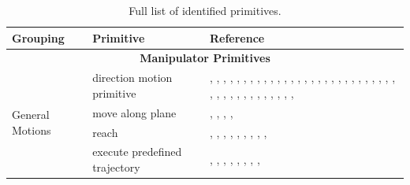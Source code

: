 \begin{table}[!h]
\thispagestyle{empty}

\caption{Full list of identified primitives.}
\label{tab_primitives}
\centering
\begin{tabular}{|p{4cm}|p{5cm}|p{15cm}|}
\hline
\textbf{Grouping} & \textbf{Primitive} & \textbf{Reference} \\
\hline
\multicolumn{3}{|c|}{\textbf{Manipulator Primitives}} \\
\hline
\multirow{4}{*}{\parbox{3cm}{General Motions}}
    & direction motion primitive      & \cite{Mitrevski2019LucyTT}, \cite{Nguyen2012AutonomouslyLT}, \cite{Huang2013BehaviorB}, \cite{Cohen2011PlanningFM}, \cite{Tsay2018BehavioristicIP}, \cite{Singh2013CoordinatingMM}, \cite{Andersen2017IntegrationOA}, \cite{Ding2022IntelligentAF}, \cite{Rodehutskors2015IntuitiveBT}, \cite{Pedersen2014IntuitiveSP}, \cite{Orsula2022LearningTG}, \cite{Li2019ManipulationSA}, \cite{Shi2012MobileRA}, \cite{Groth2013MultitaskingOC}, \cite{Bouachari2018ObjectPC}, \cite{Partovi2017ReactiveIM}, \cite{Pedersen2016RobotSF}, \cite{Cohen2012SearchbasedPF}, \cite{Cohen2010SearchbasedPF}, \cite{Huang2023SkillTA}, \cite{Lim2019SkillbasedAA}, \cite{Amaral2017SkillbasedAA}, \cite{Diab2020SkillMaNA}, \cite{Schwarz2018TeamNA}, \cite{Karumanchi2017TeamRS}, \cite{Thakar2018TowardsTT}, \cite{MacKenzie1996BehaviorbasedMM}, \cite{Hentout2007BehaviourbasedAF}, \cite{Sequeira2000BehaviourbasedCB}, \cite{Aarno2008MotionIR}, \cite{Confente2025SkinMachineIW}, \cite{Guo2025AdaptiveSC}, \cite{engelbracht2024spotlightroboticsceneunderstanding}, \cite{Lopes2026CARGOAM}, \cite{Gupta2025PreciseMM}, \cite{Wu2024InTW}, \cite{Caro2025PushSN}, \cite{Xiao2025AutonomousBC}, \cite{Williams2012ARA}, \cite{Shan2026DockAnywhereDV}, \cite{Mounsif2020BAMBA}, \cite{Watanabe2025IntegratingBP} \\
\cline{2-3}
    & move along plane                & \cite{Groth2013MultitaskingOC}, \cite{Li2020PatternAA}, \cite{Waarsing2003BehaviorbasedMM}, \cite{Gller2024APB}, \cite{Fu2024MobileAL} \\
\cline{2-3}
    & reach                           & \cite{Lopera2012ComparingMG}, \cite{Youngquist2022EvaluatingSA}, \cite{Orsula2022LearningTG}, \cite{Beetz2016OpenRR}, \cite{Zhao2025ReactiveWL}, \cite{Nagatani1996DesigningSA}, \cite{Nagatani1996DooropeningBO}, \cite{Jauhri2022RobotLO}, \cite{Akkaladevi2024TowardsAB}, \cite{Mounsif2020BAMBA} \\
\cline{2-3}
    & execute predefined trajectory   & \cite{Rodehutskors2015IntuitiveBT}, \cite{Andersen2015IntuitiveTP}, \cite{Settimi2016MotionPB}, \cite{Zhao2025ReactiveWL}, \cite{Schwarz2018TeamNA}, \cite{Waarsing2003BehaviorbasedMM}, \cite{Nagatani1996DesigningSA}, \cite{Nagatani1996DooropeningBO}, \cite{Waarsing2005FromBI} \\

\end{tabular}
\end{table}
